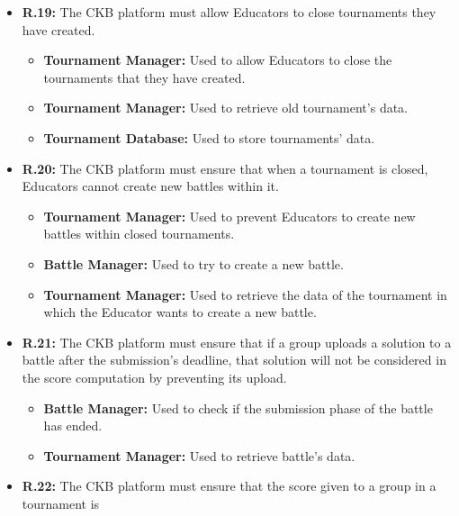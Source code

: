 \documentclass{article}
\begin{document}
{\begin{itemize}
          name, deadline, access method, programming language.
          \begin{itemize}
              \item \textbf{Tournament Manager:} Used to check if the characteristics of the tournaments
              that the Educator wants to create respect some constraints.
          \end{itemize}
    \item \textbf{R.19:} The CKB platform must allow Educators to close tournaments they have created.
          \begin{itemize}
              \item \textbf{Tournament Manager:} Used to allow Educators to close the tournaments that they have
              created.
              \item \textbf{Tournament Manager:} Used to retrieve old tournament's data.
              \item \textbf{Tournament Database:} Used to store tournaments' data.
          \end{itemize}
    \item \textbf{R.20:} The CKB platform must ensure that when a tournament is closed, Educators cannot create new battles
          within it.
          \begin{itemize}
              \item \textbf{Tournament Manager:} Used to prevent Educators to create new battles
                within closed tournaments.
            \item \textbf{Battle Manager:} Used to try to create a new battle.
            \item \textbf{Tournament Manager:} Used to retrieve the data of the tournament in which
            the Educator wants to create a new battle. 
          \end{itemize}
    \item \textbf{R.21:} The CKB platform must ensure that if a group uploads a solution to a battle after the submission's deadline,
          that solution will not be considered in the score computation by preventing its upload.
          \begin{itemize}
              \item \textbf{Battle Manager:} Used to check if the submission phase of the battle has ended.
              \item \textbf{Tournament Manager:} Used to retrieve battle's data. 
          \end{itemize}
    \item \textbf{R.22:} The CKB platform must ensure that the score given to a group in a tournament is

\end{itemize}}
\end{document}
